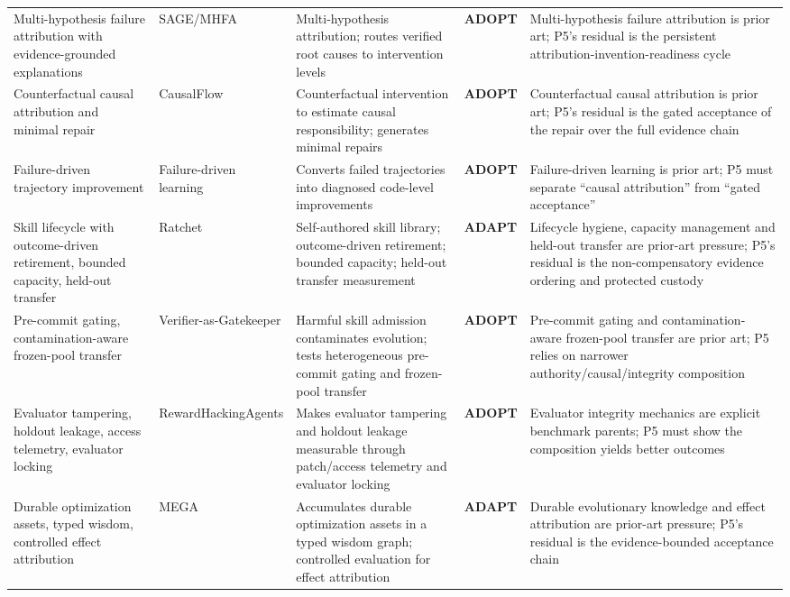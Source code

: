 {\begin{longtable}{N{0.62in}N{1.14in}N{1.90in}N{0.42in}N{2.42in}}
  Multi-hypothesis failure attribution with evidence-grounded explanations & SAGE/MHFA \cite{sagemhfa2026} & Multi-hypothesis attribution; routes verified root causes to intervention levels & \textbf{ADOPT} & Multi-hypothesis failure attribution is prior art; P5's residual is the persistent attribution-invention-readiness cycle \\
  Counterfactual causal attribution and minimal repair & CausalFlow \cite{causalflow2026} & Counterfactual intervention to estimate causal responsibility; generates minimal repairs & \textbf{ADOPT} & Counterfactual causal attribution is prior art; P5's residual is the gated acceptance of the repair over the full evidence chain \\
  Failure-driven trajectory improvement & Failure-driven learning \cite{failurelearning2026} & Converts failed trajectories into diagnosed code-level improvements & \textbf{ADOPT} & Failure-driven learning is prior art; P5 must separate ``causal attribution'' from ``gated acceptance'' \\
  Skill lifecycle with outcome-driven retirement, bounded capacity, held-out transfer & Ratchet \cite{ratchet2026} & Self-authored skill library; outcome-driven retirement; bounded capacity; held-out transfer measurement & \textbf{ADAPT} & Lifecycle hygiene, capacity management and held-out transfer are prior-art pressure; P5's residual is the non-compensatory evidence ordering and protected custody \\
  Pre-commit gating, contamination-aware frozen-pool transfer & Verifier-as-Gatekeeper \cite{vag2026} & Harmful skill admission contaminates evolution; tests heterogeneous pre-commit gating and frozen-pool transfer & \textbf{ADOPT} & Pre-commit gating and contamination-aware frozen-pool transfer are prior art; P5 relies on narrower authority/causal/integrity composition \\
  Evaluator tampering, holdout leakage, access telemetry, evaluator locking & RewardHackingAgents \cite{rewardhackingagents2026} & Makes evaluator tampering and holdout leakage measurable through patch/access telemetry and evaluator locking & \textbf{ADOPT} & Evaluator integrity mechanics are explicit benchmark parents; P5 must show the composition yields better outcomes \\
  Durable optimization assets, typed wisdom, controlled effect attribution & MEGA \cite{mega2026} & Accumulates durable optimization assets in a typed wisdom graph; controlled evaluation for effect attribution & \textbf{ADAPT} & Durable evolutionary knowledge and effect attribution are prior-art pressure; P5's residual is the evidence-bounded acceptance chain \\

\end{longtable}}

